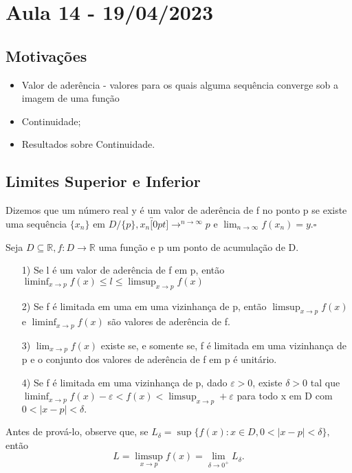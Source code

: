 \documentclass[analysis_notes.tex]{subfiles}
\begin{document}
\section{Aula 14 - 19/04/2023}
\subsection{Motiva\c c\~oes}
\begin{itemize}
	\item Valor de ader\^encia - valores para os quais alguma sequ\^encia converge sob a imagem de uma fun\c c\~ao
	\item Continuidade;
	\item Resultados sobre Continuidade.
\end{itemize}
\subsection{Limites Superior e Inferior}
\begin{def*}
	Dizemos que um n\'umero real y \'e um valor de ader\^encia de f no ponto p se existe uma sequ\^encia $\{x_{n}\}$
	em $D/\{p\}, x_{n}\overbracket[0pt]{\longrightarrow}^{n\to \infty}p$ e $\lim_{n\to\infty}f(x_{n}) = y.\square$
\end{def*}
\begin{theorem*}
	Seja $D\subseteq{\mathbb{R}}, f:D\rightarrow \mathbb{R}$ uma fun\c c\~ao e p um ponto de acumula\c c\~ao de D.
	\begin{itemize}
		\item[1)] Se l \'e um valor de ader\^encia de f em p, ent\~ao $\liminf_{x\to p}f(x) \leq{l}\leq{\limsup_{x\to p}f(x)}$
		\item[2)] Se f \'e limitada em uma em uma vizinhan\c ca de p, ent\~ao $\limsup_{x\to p}f(x)$ e
		      $\liminf_{x\to p}f(x)$ s\~ao valores de ader\^encia de f.
		\item[3)] $\lim_{x\to p}f(x)$ existe se, e somente se, f \'e limitada em uma vizinhan\c ca de p e o conjunto dos
		      valores de ader\^encia de f em p \'e unit\'ario.
		\item[4)] Se f \'e limitada em uma vizinhan\c ca de p, dado $\varepsilon > 0$, existe $\delta > 0$ tal que
		      $\liminf_{x\to p}f(x) - \varepsilon < f(x) < \limsup_{x\to p} + \varepsilon$ para todo x em D com $0<|x-p|<\delta.$
	\end{itemize}
\end{theorem*}
Antes de prov\'a-lo, observe que, se $L_{\delta} = \sup\{f(x):x\in D, 0 < |x-p| < \delta\},$ ent\~ao
$$
	L = \limsup_{x\to p}f(x) = \lim_{\delta\to 0^{+}}L_{\delta}.
$$
\end{document}

